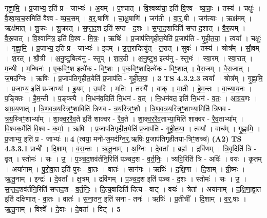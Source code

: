 \documentclass[17pt]{extarticle}
\begin{document}
                  गृ॒ह्णा॒मि॒ । प्र॒जाभ्य॒ इति॑ प्र - जाभ्यः॑ । अ॒यम् । प॒श्चात् । वि॒श्वव्य॑चा॒ इति॑ वि॒श्व - व्य॒चाः॒ । तस्य॑ । चक्षुः॑ । वै॒श्व॒व्य॒च॒समिति॑ वैश्व - व्य॒च॒सम् । व॒र्॒.षाणि॑ । चा॒क्षु॒षाणि॑ । जग॑ती । वा॒र्॒.षी । जग॑त्याः । ऋक्ष॑मम् । ऋक्ष॑मात् । शु॒क्रः । शु॒क्रात् । स॒प्त॒द॒श इति॑ सप्त - द॒शः । स॒प्त॒द॒शादिति॑ सप्त-द॒शात् । वै॒रू॒पम् । वै॒रू॒पात् । वि॒श्वामि॑त्र॒ इति॑ वि॒श्व - मि॒त्रः॒ । ऋषिः॑ । प्र॒जाप॑तिगृहीत॒येति॑ प्र॒जाप॑ति - गृ॒ही॒त॒या॒ । त्वया᳚ । चक्षुः॑ । गृ॒ह्णा॒मि॒ । प्र॒जाभ्य॒ इति॑ प्र - जाभ्यः॑ । इ॒दम् । उ॒त्त॒रादित्यु॑त् - त॒रात् । सुवः॑ । तस्य॑ । श्रोत्र᳚म् । सौ॒वम् । श॒रत् । श्रौ॒त्री । अ॒नु॒ष्टुबित्य॑नु - स्तुप् । शा॒र॒दी । अ॒नु॒ष्टुभ॒ इत्य॑नु - स्तुभः॑ । स्वा॒रम् । स्वा॒रात् । म॒न्थी । म॒न्थिनः॑ । ए॒क॒विꣳ॒॒श इत्ये॑क - विꣳ॒॒शः । ए॒क॒विꣳ॒॒शादित्ये॑क - विꣳ॒॒शात् । वै॒रा॒जम् । वै॒रा॒जात् । ज॒मद॑ग्निः । ऋषिः॑ । प्र॒जाप॑तिगृहीत॒येति॑ प्र॒जाप॑ति - गृ॒ही॒त॒या॒ । \textbf{  3} \newline
                  \newline
                                \textbf{ TS 4.3.2.3} \newline
                  त्वया᳚ । श्रोत्र᳚म् । गृ॒ह्णा॒मि॒ । प्र॒जाभ्य॒ इति॑ प्र-जाभ्यः॑ । इ॒यम् । उ॒परि॑ । म॒तिः । तस्यै᳚ । वाक् । मा॒ती । हे॒म॒न्तः । वा॒च्या॒य॒नः । प॒ङ्क्तिः । है॒म॒न्ती । प॒ङ्क्त्यै । नि॒धन॑व॒दिति॑ नि॒धन॑ - व॒त् । नि॒धन॑वत॒ इति॑ नि॒धन॑ - व॒तः॒ । आ॒ग्र॒य॒णः । आ॒ग्र॒य॒णात् । त्रि॒ण॒व॒त्र॒य॒स्त्रिꣳ॒॒शाविति॑ त्रिणव - त्र॒य॒स्त्रिꣳ॒॒शौ । त्रि॒ण॒व॒त्र॒य॒स्त्रिꣳ॒॒शाभ्या॒मिति॑ त्रिणव - त्र॒य॒स्त्रिꣳ॒॒शाभ्या᳚म् । शा॒क्व॒र॒रै॒व॒ते इति॑ शाक्वर - रै॒व॒ते । शा॒क्व॒र॒रै॒व॒ताभ्या॒मिति॑ शाक्वर - रै॒व॒ताभ्या᳚म् । वि॒श्वक॒र्मेति॑ वि॒श्व - क॒र्मा॒ । ऋषिः॑ । प्र॒जाप॑तिगृहीत॒येति॑ प्र॒जाप॑ति - गृ॒ही॒त॒या॒ । त्वया᳚ । वाच᳚म् । गृ॒ह्णा॒मि॒ । प्र॒जाभ्य॒ इति॑ प्र - जाभ्यः॑ ॥ \textbf{  4 } \newline
                  \newline
                      (त्वया॒ मनो॑-ज॒मद॑ग्नि॒र्॒.ऋषिः॑ प्र॒जाप॑तिगृहीतया-त्रिꣳ॒॒शच्च॑)  \textbf{(A2)} \newline \newline
                                \textbf{ TS 4.3.3.1} \newline
                  प्राची᳚ । दि॒शाम् । व॒स॒न्तः । ऋ॒तू॒नाम् । अ॒ग्निः । दे॒वता᳚ । ब्रह्म॑ । द्रवि॑णम् । त्रि॒वृदिति॑ त्रि - वृत् । स्तोमः॑ । सः । उ॒ । प॒ञ्च॒द॒शव॑र्तनि॒रिति॑ पञ्चद॒श - व॒र्त॒निः॒ । त्र्यवि॒रिति॑ त्रि - अविः॑ । वयः॑ । कृ॒तम् । अया॑नाम् । पु॒रो॒वा॒त इति॑ पुरः - वा॒तः । वातः॑ । सान॑गः । ऋषिः॑ । द॒क्षि॒णा । दि॒शाम् । ग्री॒ष्मः । ऋ॒तू॒नाम् । इन्द्रः॑ । दे॒वता᳚ । क्ष॒त्रम् । द्रवि॑णम् । प॒ञ्च॒द॒श इति॑ पञ्च - द॒शः । स्तोमः॑ । सः । उ॒ । स॒प्त॒द॒शव॑र्तनि॒रिति॑ सप्तद॒श - व॒र्त॒निः॒ । दि॒त्य॒वाडिति॑ दित्य - वाट् । वयः॑ । त्रेता᳚ । अया॑नाम् । द॒क्षि॒णा॒द्वा॒त इति॑ दक्षिणात् - वा॒तः । वातः॑ । स॒ना॒तन॒ इति॑ सना - तनः॑ । ऋषिः॑ । प्र॒तीची᳚ । दि॒शाम् । व॒र्॒.षाः । ऋ॒तू॒नाम् । विश्वे᳚ । दे॒वाः । दे॒वता᳚ । विट् । \textbf{  5} \newline
\end{document}
